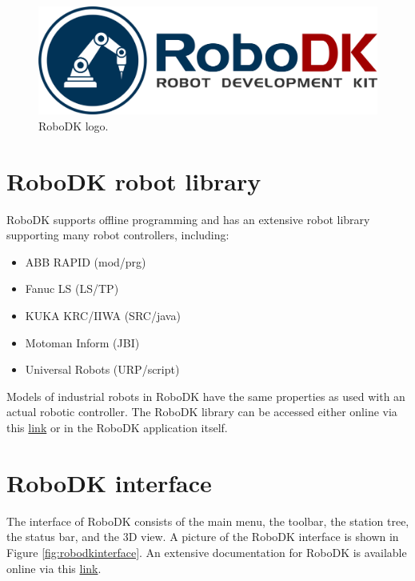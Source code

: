 \begin{figure}[h]
    \centering
    \includegraphics[width=0.6\linewidth]{img/robodk_logo.png}
    \caption{RoboDK logo.}
    \label{fig:robodklogo}
\end{figure}

\section{RoboDK robot library}

RoboDK supports offline programming and has an extensive robot library supporting many robot controllers, including:

\begin{itemize}
    \item ABB RAPID (mod/prg)
    \item Fanuc LS (LS/TP)
    \item KUKA KRC/IIWA (SRC/java)
    \item Motoman Inform (JBI)
    \item Universal Robots (URP/script)
\end{itemize}
Models of industrial robots in RoboDK have the same properties as used with an actual robotic controller. The RoboDK library can be accessed either online via this \href{https://en.etsmtl.ca/unites-de-recherche/coro/accueil?lang=en-CA}{link}  or in the RoboDK application itself. 



\section{RoboDK interface}

The interface of RoboDK consists of the main menu, the toolbar, the station tree, the status bar, and the 3D view. A picture of the RoboDK interface is shown in Figure \ref{fig:robodkinterface}. An extensive documentation for RoboDK is available online via this \href{https://robodk.com/doc/en/Basic-Guide.html#Start}{link}.

